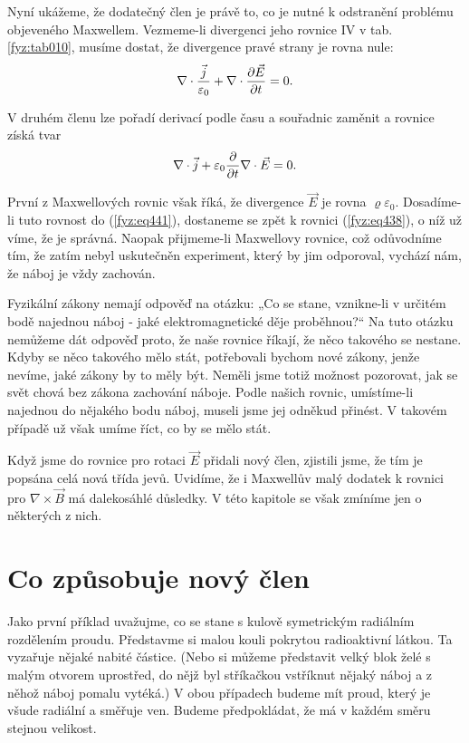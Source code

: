   Nyní ukážeme, že dodatečný člen je právě to, co je nutné k odstranění problému objeveného 
  Maxwellem. Vezmeme-li divergenci jeho rovnice IV v tab. \ref{fyz:tab010}, musíme dostat, že 
  divergence pravé strany je rovna nule:
  \begin{equation}\label{fyz:eq440}
    \nabla\cdot\frac{\vec{j}}{\varepsilon_0} + \nabla\cdot\dfrac{\partial \vec{E}}{\partial t} = 0.
  \end{equation}
  
  V druhém členu lze pořadí derivací podle času a souřadnic zaměnit a rovnice získá tvar
  \begin{equation}\label{fyz:eq441}
    \nabla\cdot\vec{j} + \varepsilon_0\dfrac{\partial  }{\partial t}\nabla\cdot\vec{E} = 0.
  \end{equation}
  
  První z Maxwellových rovnic však říká, že divergence \(\vec{E}\) je rovna 
  \(\varrho\varepsilon_0\). Dosadíme-li tuto rovnost do (\ref{fyz:eq441}), dostaneme se zpět k 
  rovnici (\ref{fyz:eq438}), o níž už víme, že je správná. Naopak přijmeme-li Maxwellovy rovnice, 
  což odůvodníme tím, že zatím nebyl uskutečněn experiment, který by jim odporoval, vychází nám, že 
  náboj je vždy zachován. 
  
  Fyzikální zákony nemají odpověď na otázku: „Co se stane, vznikne-li v určitém bodě najednou 
  náboj - jaké elektromagnetické děje proběhnou?“ Na tuto otázku nemůžeme dát odpověď proto, že 
  naše rovnice říkají, že něco takového se nestane. Kdyby se něco takového mělo stát, potřebovali 
  bychom nové zákony, jenže nevíme, jaké zákony by to měly být. Neměli jsme totiž možnost 
  pozorovat, jak se svět chová bez zákona zachování náboje. Podle našich rovnic, umístíme-li 
  najednou do nějakého bodu náboj, museli jsme jej odněkud přinést. V takovém případě už však 
  umíme říct, co by se mělo stát. 
  
  Když jsme do rovnice pro rotaci \(\vec{E}\) přidali nový člen, zjistili jsme, že tím je popsána 
  celá nová třída jevů. Uvidíme, že i Maxwellův malý dodatek k rovnici pro \(\nabla\times\vec{B}\) 
  má dalekosáhlé důsledky. V této kapitole se však zmíníme jen o některých z nich.
  
  
\section{Co způsobuje nový člen}\label{fyz:IIchapXVIIIsecI}
  Jako první příklad uvažujme, co se stane s kulově symetrickým radiálním rozdělením proudu. 
  Představme si malou kouli pokrytou radioaktivní látkou. Ta vyzařuje nějaké nabité částice. (Nebo 
  si můžeme představit velký blok želé s malým otvorem uprostřed, do nějž byl stříkačkou vstříknut 
  nějaký náboj a z něhož náboj pomalu vytéká.) V obou případech budeme mít proud, který je všude 
  radiální a směřuje ven. Budeme předpokládat, že má v každém směru stejnou velikost.
  
